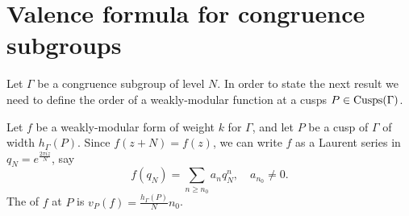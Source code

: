 \section{Valence formula for congruence subgroups}

  Let $\Gamma$ be a congruence subgroup of level $N$. In order to state the next result we need to define the order of a weakly-modular function at a cusps $P\in\operatorname{Cusps}(\Gamma)$.
\begin{definition}
  Let $f$ be a weakly-modular form of weight $k$ for $\Gamma$, and let $P$ be a cusp of $\Gamma$ of width $h_\Gamma(P)$. Since $f(z+N)=f(z)$, we can write $f$ as a Laurent series in $q_N=e^{\frac{2\pi i z}{N}}$, say
\[
f(q_N) = \sum_{n\geq n_0} a_n q_N^n,\quad a_{n_0}\neq 0.
\]
The  of $f$ at $P$ is $v_P(f) = \frac{h_\Gamma(P)}{N}n_0$.
\end{definition}

